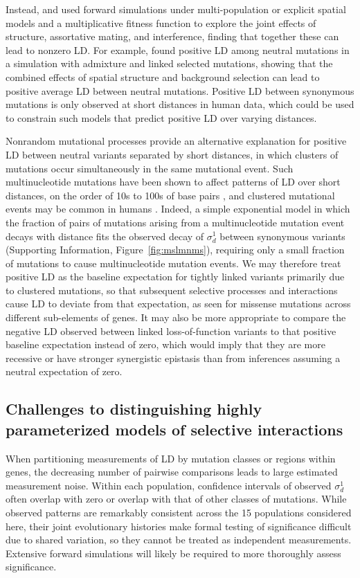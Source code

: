 \documentclass[]{article}
\begin{document}
Instead, \citet{Sohail2017-zq} and \citet{Sandler2021-of} used forward
simulations under multi-population or explicit spatial models and a
multiplicative fitness function to explore the joint effects of structure,
assortative mating, and interference, finding that together these can lead to
nonzero LD. For example, \citet{Sandler2021-of} found positive LD among neutral
mutations in a simulation with admixture and linked selected mutations, showing
that the combined effects of spatial structure and background selection can
lead to positive average LD between neutral mutations. Positive LD between
synonymous mutations is only observed at short distances in human data, which
could be used to constrain such models that predict positive LD over varying
distances.

Nonrandom mutational processes provide an alternative explanation for positive
LD between neutral variants separated by short distances, in which clusters of
mutations occur simultaneously in the same mutational event. Such
multinucleotide mutations have been shown to affect patterns of LD over short
distances, on the order of 10s to 100s of base pairs \citep{Harris2014-zg}, and
clustered mutational events may be common in humans \citep{Besenbacher2016-ac}.
Indeed, a simple exponential model in which the fraction of pairs of mutations
arising from a multinucleotide mutation event decays with distance fits the
observed decay of \(\sigma_d^1\) between synonymous variants (Supporting
Information, Figure~\ref{fig:mslmnms}), requiring only a small fraction of
mutations to cause multinucleotide mutation events. We may therefore treat
positive LD as the baseline expectation for tightly linked variants primarily
due to clustered mutations, so that subsequent selective processes and
interactions cause LD to deviate from that expectation, as seen for missense
mutations across different sub-elements of genes. It may also be more
appropriate to compare the negative LD observed between linked loss-of-function
variants to that positive baseline expectation instead of zero, which would
imply that they are more recessive or have stronger synergistic epistasis than
from inferences assuming a neutral expectation of zero.

\subsection{Challenges to distinguishing highly parameterized models of selective interactions}

When partitioning measurements of LD by mutation classes or regions within
genes, the decreasing number of pairwise comparisons leads to large estimated
measurement noise. Within each population, confidence intervals of observed
\(\sigma_d^1\) often overlap with zero or overlap with that of other classes of
mutations. While observed patterns are remarkably consistent across the 15
populations considered here, their joint evolutionary histories make formal
testing of significance difficult due to shared variation, so they cannot be
treated as independent measurements. Extensive forward simulations will likely
be required to more thoroughly assess significance.
\end{document}
